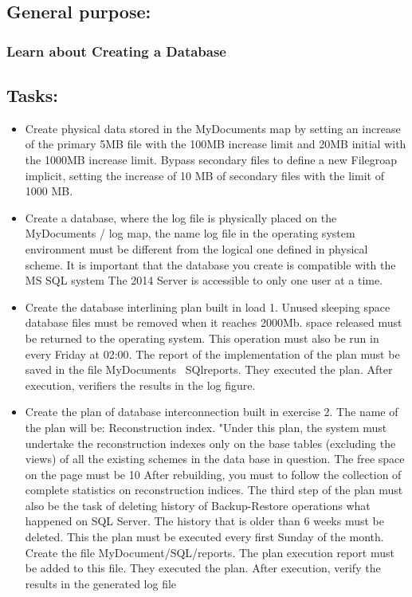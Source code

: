 \documentclass[12pt]{article}
\begin{document}
        \pagebreak
        \subsection*{ General purpose:}
        \subsubsection*{ Learn about Creating a Database}
        
        \subsection*{Tasks:}
        \begin{itemize}
                \item Create physical data stored in the MyDocuments map by setting an increase of the primary 5MB file with the 100MB increase limit and 20MB initial with the 1000MB increase limit. Bypass secondary files to define a new Filegroap implicit,
                setting the increase of 10 MB of secondary files with the limit of 1000 MB.
                \item Create a database, where the log file is physically placed on the MyDocuments / log map, the name
                log file in the operating system environment must be different from the logical one defined in
                physical scheme. It is important that the database you create is compatible with the MS SQL system
                The 2014 Server is accessible to only one user at a time.
                \item Create the database interlining plan built in load 1. Unused sleeping space
                database files must be removed when it reaches 2000Mb. space
                released must be returned to the operating system. This operation must also be run in
                every Friday at 02:00. The report of the implementation of the plan must be saved in the file
                MyDocuments \ SQlreports. They executed the plan. After execution, verifiers
                the results in the log figure.
                \item Create the plan of database interconnection built in exercise 2. The name of the plan will be: Reconstruction index. "Under this plan, the system must undertake the reconstruction
                indexes only on the base tables (excluding the views) of all the existing schemes
                in the data base in question. The free space on the page must be 10 %
                After rebuilding, you must to follow the collection of complete statistics on reconstruction indices. The third step of the
                plan must also be the task of deleting history of Backup-Restore operations
                what happened on SQL Server. The history that is older than 6 weeks must be deleted. This
                the plan must be executed every first Sunday of the month. Create the file
                MyDocument/SQL/reports. The plan execution report must be added to this
                file. They executed the plan. After execution, verify the results in the generated log file
                

\end{itemize}
\end{document}
